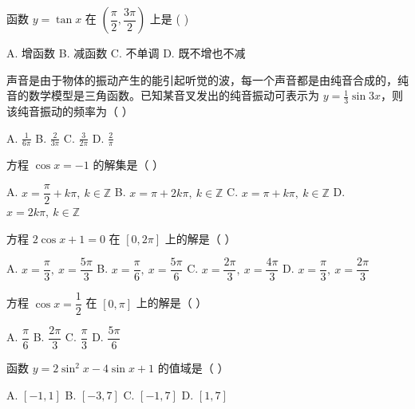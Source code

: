 \documentclass[11pt, a4paper]{article}
\begin{document}
\begin{baitap}[5]
函数 $y = \tan x$ 在 $\left(\dfrac{\pi}{2}, \dfrac{3\pi}{2}\right)$ 上是 ( )
\par\vspace{3pt}
\noindent A. 增函数 \quad B. 减函数 \quad C. 不单调 \quad D. 既不增也不减
\end{baitap}

\begin{baitap}[6]
声音是由于物体的振动产生的能引起听觉的波，每一个声音都是由纯音合成的，纯音的数学模型是三角函数。已知某音叉发出的纯音振动可表示为 $y=\frac{1}{3}\sin3x$，则该纯音振动的频率为（ ）
\par\vspace{3pt}
\noindent A. $\frac{1}{6\pi}$ \quad B. $\frac{2}{3\pi}$ \quad C. $\frac{3}{2\pi}$ \quad D. $\frac{2}{\pi}$
\end{baitap}

\begin{baitap}[7]
方程 $\cos x = -1$ 的解集是（ ）
\par\vspace{3pt}
\noindent A. $x = \dfrac{\pi}{2} + k\pi,\ k \in \mathbb{Z}$ \quad B. $x = \pi + 2k\pi,\ k \in \mathbb{Z}$ \quad C. $x = \pi + k\pi,\ k \in \mathbb{Z}$ \quad D. $x = 2k\pi,\ k \in \mathbb{Z}$
\end{baitap}

\begin{baitap}[8]
方程 $2\cos x + 1 = 0$ 在 $[0, 2\pi]$ 上的解是（ ）
\par\vspace{3pt}
\noindent A. $x = \dfrac{\pi}{3},\ x = \dfrac{5\pi}{3}$ \quad B. $x = \dfrac{\pi}{6},\ x = \dfrac{5\pi}{6}$ \quad C. $x = \dfrac{2\pi}{3},\ x = \dfrac{4\pi}{3}$ \quad D. $x = \dfrac{\pi}{3},\ x = \dfrac{2\pi}{3}$
\end{baitap}

\begin{baitap}[9]
方程 $\cos x = \dfrac{1}{2}$ 在 $[0, \pi]$ 上的解是（ ）
\par\vspace{3pt}
\noindent A. $\dfrac{\pi}{6}$ \quad B. $\dfrac{2\pi}{3}$ \quad C. $\dfrac{\pi}{3}$ \quad D. $\dfrac{5\pi}{6}$
\end{baitap}

\begin{baitap}[10]
函数 $y = 2\sin^2 x - 4\sin x + 1$ 的值域是（ ）
\par\vspace{3pt}
\noindent A. $[-1,1]$ \quad B. $[-3,7]$ \quad C. $[-1,7]$ \quad D. $[1,7]$
\end{baitap}
\end{document}
